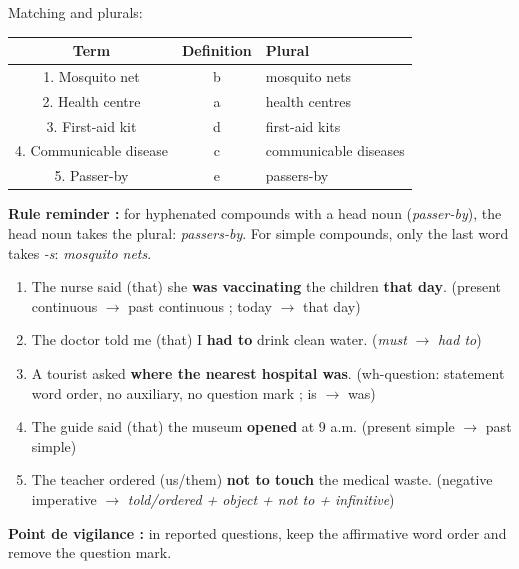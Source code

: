 \documentclass[11pt]{article}
\begin{document}
\begin{corrige}
Matching and plurals:
\begin{center}
\begin{tabular}{|c|c|l|}
\hline
\textbf{Term} & \textbf{Definition} & \textbf{Plural} \\
\hline
1. Mosquito net & b & mosquito nets \\
2. Health centre & a & health centres \\
3. First-aid kit & d & first-aid kits \\
4. Communicable disease & c & communicable diseases \\
5. Passer-by & e & passers-by \\
\hline
\end{tabular}
\end{center}
\textbf{Rule reminder :} for hyphenated compounds with a head noun (\emph{passer-by}), the head noun takes the plural: \emph{passers-by}. For simple compounds, only the last word takes \emph{-s}: \emph{mosquito nets}.
\end{corrige}

\begin{corrige}
\begin{enumerate}
    \item The nurse said (that) she \textbf{was vaccinating} the children \textbf{that day}. (present continuous $\rightarrow$ past continuous ; today $\rightarrow$ that day)
    \item The doctor told me (that) I \textbf{had to} drink clean water. (\emph{must} $\rightarrow$ \emph{had to})
    \item A tourist asked \textbf{where the nearest hospital was}. (wh-question: statement word order, no auxiliary, no question mark ; is $\rightarrow$ was)
    \item The guide said (that) the museum \textbf{opened} at 9 a.m. (present simple $\rightarrow$ past simple)
    \item The teacher ordered (us/them) \textbf{not to touch} the medical waste. (negative imperative $\rightarrow$ \emph{told/ordered + object + not to + infinitive})
\end{enumerate}
\textbf{Point de vigilance :} in reported questions, keep the affirmative word order and remove the question mark.
\end{corrige}
\end{document}
